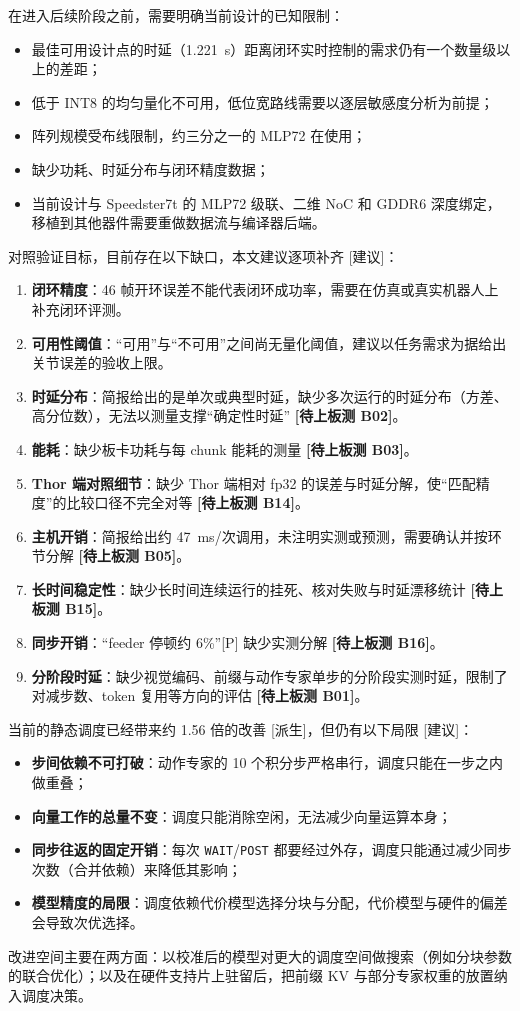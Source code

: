 \documentclass[a4paper,10.5pt]{ctexart}
\newcommand{\tP}{\textsf{[P]}}              %
\newcommand{\tD}{\textsf{[派生]}}           %
\newcommand{\tR}{\textsf{[建议]}}           %
\newcommand{\tB}[1]{\textcolor{red!70!black}{\textsf{\textbf{[待上板测 #1]}}}}
\begin{document}
在进入后续阶段之前，需要明确当前设计的已知限制：
\begin{itemize}
  \item 最佳可用设计点的时延（1.221~s）距离闭环实时控制的需求仍有一个数量级以上的差距；
  \item 低于 INT8 的均匀量化不可用，低位宽路线需要以逐层敏感度分析为前提；
  \item 阵列规模受布线限制，约三分之一的 MLP72 在使用；
  \item 缺少功耗、时延分布与闭环精度数据；
  \item 当前设计与 Speedster7t 的 MLP72 级联、二维 NoC 和 GDDR6 深度绑定，移植到其他器件需要重做数据流与编译器后端。
\end{itemize}

对照验证目标，目前存在以下缺口，本文建议逐项补齐 \tR：
\begin{enumerate}
  \item \textbf{闭环精度}：46 帧开环误差不能代表闭环成功率，需要在仿真或真实机器人上补充闭环评测。
  \item \textbf{可用性阈值}：“可用”与“不可用”之间尚无量化阈值，建议以任务需求为据给出关节误差的验收上限。
  \item \textbf{时延分布}：简报给出的是单次或典型时延，缺少多次运行的时延分布（方差、高分位数），无法以测量支撑“确定性时延” \tB{B02}。
  \item \textbf{能耗}：缺少板卡功耗与每 chunk 能耗的测量 \tB{B03}。
  \item \textbf{Thor 端对照细节}：缺少 Thor 端相对 fp32 的误差与时延分解，使“匹配精度”的比较口径不完全对等 \tB{B14}。
  \item \textbf{主机开销}：简报给出约 47~ms/次调用，未注明实测或预测，需要确认并按环节分解 \tB{B05}。
  \item \textbf{长时间稳定性}：缺少长时间连续运行的挂死、核对失败与时延漂移统计 \tB{B15}。
  \item \textbf{同步开销}：“feeder 停顿约 6\%”\tP{} 缺少实测分解 \tB{B16}。
  \item \textbf{分阶段时延}：缺少视觉编码、前缀与动作专家单步的分阶段实测时延，限制了对减步数、token 复用等方向的评估 \tB{B01}。
\end{enumerate}

当前的静态调度已经带来约 1.56 倍的改善 \tD，但仍有以下局限 \tR：
\begin{itemize}
  \item \textbf{步间依赖不可打破}：动作专家的 10 个积分步严格串行，调度只能在一步之内做重叠；
  \item \textbf{向量工作的总量不变}：调度只能消除空闲，无法减少向量运算本身；
  \item \textbf{同步往返的固定开销}：每次 \texttt{WAIT}/\texttt{POST} 都要经过外存，调度只能通过减少同步次数（合并依赖）来降低其影响；
  \item \textbf{模型精度的局限}：调度依赖代价模型选择分块与分配，代价模型与硬件的偏差会导致次优选择。
\end{itemize}
改进空间主要在两方面：以校准后的模型对更大的调度空间做搜索（例如分块参数的联合优化）；以及在硬件支持片上驻留后，把前缀 KV 与部分专家权重的放置纳入调度决策。
\end{document}
